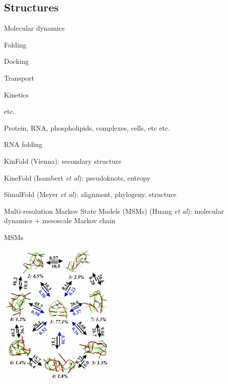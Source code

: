 \documentclass{beamer}
\begin{document}
\subsection{Structures}

\begin{frame}{Molecular dynamics}

\itemb
\item Folding
\item Docking
\item Transport
\item Kinetics
\item etc.
\iteme

Protein, RNA, phospholipids, complexes, cells, etc etc.


\end{frame}

\begin{frame}{RNA folding}

\itemb
\item KinFold (Vienna): secondary structure
\item KineFold (Isambert {\em et al}): pseudoknots, entropy
\item SimulFold (Meyer {\em et al}): alignment, phylogeny, structure
\item Multi-resolution Markov State Models (MSMs) (Huang {\em et al}): molecular dynamics + mesoscale Markov chain
\iteme

\end{frame}


\begin{frame}{MSMs}

\centerline{  \includegraphics[width=.4\textwidth]{MSMfolding.jpg}  }

\end{frame}
\end{document}
